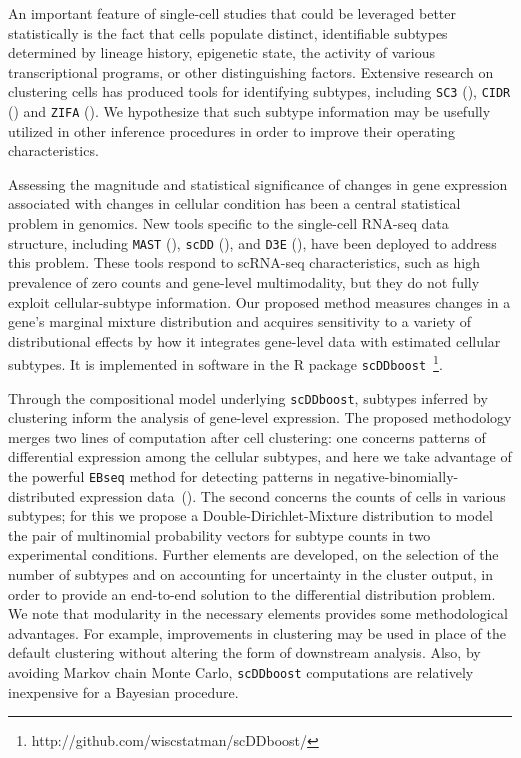 \documentclass[aoas,preprint]{imsart}
\begin{document}
An important feature of single-cell studies that could be leveraged better
statistically is the fact that cells populate distinct, identifiable subtypes
determined by lineage history, epigenetic state, the activity
of various transcriptional programs, or other 
distinguishing factors. Extensive research on clustering cells
has produced tools for identifying subtypes, including 
 \verb+SC3+ (\cite{sc3}), \verb+CIDR+ (\cite{CIDR}) and \verb+ZIFA+ (\cite{ZIFA}).
We hypothesize that such
subtype information may be usefully utilized in other inference procedures in order
to improve their operating characteristics. 

Assessing the magnitude and statistical significance of changes in gene
expression associated with changes in cellular condition has been a central
statistical problem in genomics. New tools specific to
the single-cell RNA-seq data structure, including \verb+MAST+
(\cite{ref:MAST}), \verb+scDD+ (\cite{ref:scDD}), and \verb+D3E+ (\cite{ref:d3e}),
have been deployed to address this problem.
These tools respond
to scRNA-seq characteristics, such as high prevalence of zero counts and
gene-level multimodality, but they do not fully exploit cellular-subtype
information.  Our proposed method 
 measures changes in a gene's marginal mixture distribution  and
acquires sensitivity to a variety of distributional effects by how it integrates 
gene-level data with estimated cellular subtypes.  It is implemented in  software 
in the R package \verb+scDDboost+~\footnote{http://github.com/wiscstatman/scDDboost/}.

Through the compositional model underlying \verb+scDDboost+, subtypes inferred by clustering 
inform the analysis of gene-level expression.  The proposed methodology merges two lines of computation
after cell clustering: one concerns patterns of differential expression among 
the cellular subtypes, and here we take advantage of the powerful \verb+EBseq+ method for detecting
patterns in negative-binomially-distributed expression data~(\cite{oscope}).  The second concerns 
the counts of cells in various subtypes; for this we propose a Double-Dirichlet-Mixture distribution
to model the pair of multinomial probability vectors for subtype counts in two experimental conditions.
Further elements are developed, on the selection of the number of subtypes and on accounting for uncertainty in the cluster output,  in order to provide an end-to-end solution to the differential distribution
problem.  We note that modularity in the necessary elements provides some methodological advantages. For example,
improvements in clustering may be used in place of the default clustering
without altering the form of downstream analysis.  Also, by avoiding Markov chain Monte Carlo,
\verb+scDDboost+ computations are relatively inexpensive for a Bayesian procedure.
\end{document}
